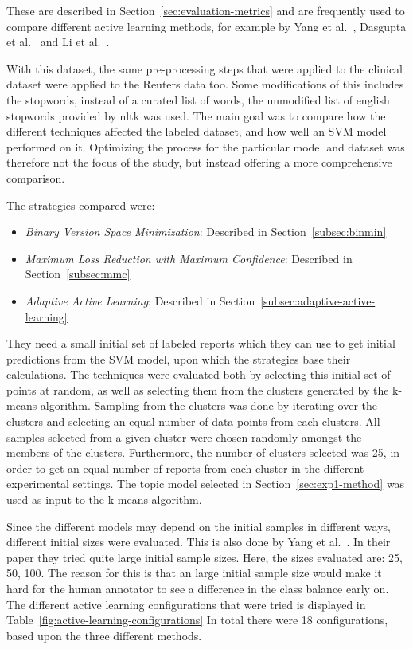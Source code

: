 These are described in Section~\ref{sec:evaluation-metrics} and are frequently used to compare different active learning methods, for example by Yang et al\@.~\cite{yang2009effective}, Dasgupta et al\@.~\cite{dasgupta2008hierarchical} and Li et al\@.~\cite{li2013active}.

With this dataset, the same pre-processing steps that were applied to the clinical dataset were applied to the Reuters data too.
Some modifications of this includes the stopwords, instead of a curated list of words, the unmodified list of english stopwords provided by nltk was used.
The main goal was to compare how the different techniques affected the labeled dataset, and how well an SVM model performed on it.
Optimizing the process for the particular model and dataset was therefore not the focus of the study, but instead offering a more comprehensive comparison.

The strategies compared were: 
\begin{itemize}
    \item \textit{Binary Version Space Minimization}: Described in Section~\ref{subsec:binmin}
    \item \textit{Maximum Loss Reduction with Maximum Confidence}: Described in Section~\ref{subsec:mmc}
    \item \textit{Adaptive Active Learning}: Described in Section~\ref{subsec:adaptive-active-learning}
\end{itemize}
They need a small initial set of labeled reports which they can use to get initial predictions from the SVM model, upon which the strategies base their calculations.
The techniques were evaluated both by selecting this initial set of points at random, as well as selecting them from the clusters generated by the k-means algorithm.
Sampling from the clusters was done by iterating over the clusters and selecting an equal number of data points from each clusters.
All samples selected from a given cluster were chosen randomly amongst the members of the clusters.
Furthermore, the number of clusters selected was 25, in order to get an equal number of reports from each cluster in the different experimental settings.
The topic model selected in Section~\ref{sec:exp1-method} was used as input to the k-means algorithm.

Since the different models may depend on the initial samples in different ways, different initial sizes were evaluated.
This is also done by Yang et al\@.~\cite{yang2009effective}.
In their paper they tried quite large initial sample sizes.
Here, the sizes evaluated are: 25, 50, 100.
The reason for this is that an large initial sample size would make it hard for the human annotator to see a difference in the class balance early on.
The different active learning configurations that were tried is displayed in Table~\ref{fig:active-learning-configurations}
In total there were 18 configurations, based upon the three different methods.

